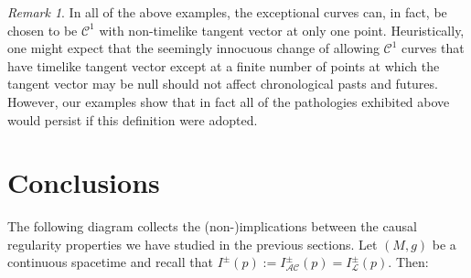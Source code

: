 \documentclass[reqno]{amsart}
\numberwithin{equation}{section}
\theoremstyle{plain}
\theoremstyle{definition}
\theoremstyle{remark}
\newtheorem{remark}[theorem]{Remark}
\begin{document}
\begin{remark}
In all of the above examples, the exceptional curves can, in fact, be chosen to be $\mathcal{C}^1$ with non-timelike tangent vector at only one point. Heuristically, one might expect that the seemingly innocuous change of allowing $\mathcal{C}^1$ curves that have timelike tangent vector except at a finite number of points at which the tangent vector may be null should not affect chronological pasts and futures. However, our examples show that in fact all of the pathologies exhibited above would persist if this definition were adopted. 
\end{remark}

\section{Conclusions}
The following diagram collects the (non-)implications between the causal regularity
properties we have studied in the previous sections. Let $(M,g)$ be a continuous spacetime and recall that 
$I^\pm(p):=I^\pm_{\mathcal{AC}}(p)=I^\pm_{\mathcal{L}}(p)$. Then:
\end{document}
